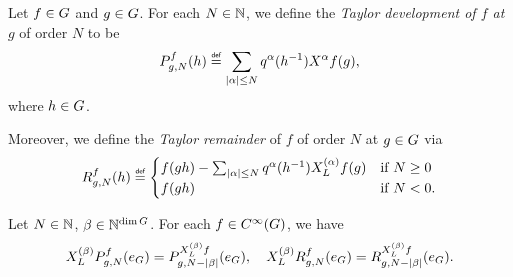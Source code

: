\begin{definition}
    Let $f \in G$ and $g \in G$.
    For each $N \in \mathbb{N}$,
    we define the \emph{Taylor development of $f$ at $g$} of order $N$ to be
    \begin{align*}
        \TaylorPolynomial f g N(h)
        \defeq
        \sum_{\abs \alpha \leq N} q^\alpha(h^{-1}) \LeftDifferentialOperator \alpha f(g),
    \end{align*}
    where $h \in G$.

    Moreover,
    we define the \emph{Taylor remainder} of $f$ of order $N$ at $g \in G$ via
    \begin{align*}
        \TaylorRemainder f g N(h) \defeq
        \begin{cases}
            f(g h) - \sum_{\abs \alpha \leq N} q^\alpha(h^{-1}) \TaylorLeftDifferentialOperator \alpha f(g) & \text{if } N \geq 0\\
            f(g h) & \text{if } N < 0.
        \end{cases}
    \end{align*}
\end{definition}

\begin{lemma}
\label{lemma:derivative_of_Taylor_polynomial_and_remainder}
    Let $N \in \mathbb{N}$, $\beta \in \mathbb{N}^{\dim G}$.
    For each $f \in {C^\infty(G)}$,
    we have
    \begin{align*}
        X^{(\beta)}_L P^{f}_{g, N} (e_G)
        = P^{X^{(\beta)}_L f}_{g, N - \left|{\beta}\right|} (e_G),
        \quad
        X^{(\beta)}_L R^{f}_{g, N} (e_G)
        = R^{X^{(\beta)}_L f}_{g, N - \left|{\beta}\right|} (e_G).
    \end{align*}
\end{lemma}

